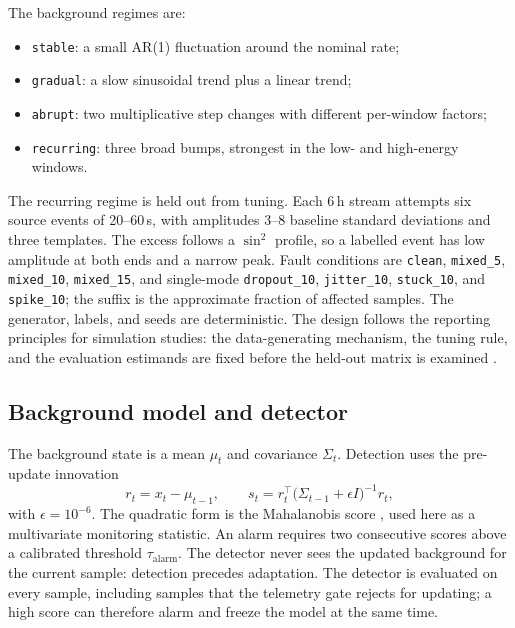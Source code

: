 \documentclass[11pt]{article}
\begin{document}
The background regimes are:
\begin{itemize}
  \item \texttt{stable}: a small AR(1) fluctuation around the nominal rate;
  \item \texttt{gradual}: a slow sinusoidal trend plus a linear trend;
  \item \texttt{abrupt}: two multiplicative step changes with different per-window factors;
  \item \texttt{recurring}: three broad bumps, strongest in the low- and high-energy windows.
\end{itemize}
The recurring regime is held out from tuning. Each 6\,h stream attempts six source events of 20--60\,s, with amplitudes 3--8 baseline standard deviations and three templates. The excess follows a $\sin^2$ profile, so a labelled event has low amplitude at both ends and a narrow peak. Fault conditions are \texttt{clean}, \texttt{mixed\_5}, \texttt{mixed\_10}, \texttt{mixed\_15}, and single-mode \texttt{dropout\_10}, \texttt{jitter\_10}, \texttt{stuck\_10}, and \texttt{spike\_10}; the suffix is the approximate fraction of affected samples. The generator, labels, and seeds are deterministic. The design follows the reporting principles for simulation studies: the data-generating mechanism, the tuning rule, and the evaluation estimands are fixed before the held-out matrix is examined \citep{morris2019simulation}.

\subsection{Background model and detector}

The background state is a mean $\mu_t$ and covariance $\Sigma_t$. Detection uses the pre-update innovation
\begin{equation}
  r_t = x_t - \mu_{t-1}, \qquad
  s_t = r_t^\top \bigl(\Sigma_{t-1} + \epsilon I\bigr)^{-1} r_t,
  \label{eq:score}
\end{equation}
with $\epsilon=10^{-6}$. The quadratic form is the Mahalanobis score \citep{mahalanobis1936distance}, used here as a multivariate monitoring statistic. An alarm requires two consecutive scores above a calibrated threshold $\tau_{\mathrm{alarm}}$. The detector never sees the updated background for the current sample: detection precedes adaptation. The detector is evaluated on every sample, including samples that the telemetry gate rejects for updating; a high score can therefore alarm and freeze the model at the same time.
\end{document}
